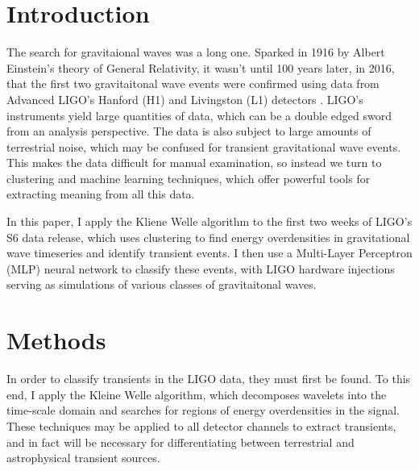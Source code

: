 \documentclass{article}
\begin{document}


\section{Introduction}
The search for gravitaional waves was a long one. Sparked in 1916 by Albert Einstein's theory of General Relativity, it wasn't until 100 years later, in 2016, that the first two gravitaitonal wave events were confirmed using data from Advanced LIGO's Hanford (H1) and Livingston (L1) detectors\citep{TheLIGOScientificCollaboration2016} \citep{Abbott2016}. LIGO's instruments yield large quantities of data, which can be a double edged sword from an analysis perspective. The data is also subject to large amounts of terrestrial noise, which may be confused for transient gravitational wave events. This makes the data difficult for manual examination, so instead we turn to clustering and machine learning techniques, which offer powerful tools for extracting meaning from all this data.

In this paper, I apply the Kliene Welle algorithm\citep{Chatterji2004}\citep{Blackburn2007} to the first two weeks of LIGO's S6 data release, which uses clustering to find energy overdensities in gravitational wave timeseries and identify transient events. I then use a Multi-Layer Perceptron (MLP) neural network to classify these events, with LIGO hardware injections serving as simulations of various classes of gravitaitonal waves.

\section{Methods}
In order to classify transients in the LIGO data, they must first be found. To this end, I apply the Kleine Welle algorithm, which decomposes wavelets into the time-scale domain and searches for regions of energy overdensities in the signal\citep{Biswas2013}\cite{Blackburn2007}. These techniques may be applied to all detector channels to extract transients, and in fact will be necessary for differentiating between terrestrial and astrophysical transient sources.
\end{document}
